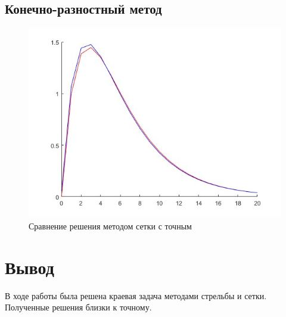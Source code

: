 \documentclass[a4paper,12pt]{article}
\begin{document}
	\subsection{Конечно-разностный метод}
	\begin{figure}[H]
		\centering
		\includegraphics[width=0.7\linewidth]{polytech/calc-math/report-lab1/subfiles/odu2}
		\caption{Сравнение решения методом сетки с точным}
		\label{fig:graph}
	\end{figure}
	
	\section{Вывод}
	В ходе работы была решена краевая задача методами стрельбы и сетки. Полученные решения близки
	к точному.
\end{document}
